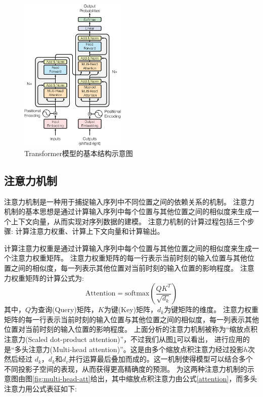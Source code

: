 \begin{figure}[htbp]
  \centering
  \includegraphics[width=0.45\textwidth]{figures/transformer.png}
  \caption{Transformer模型的基本结构示意图\cite{vaswani2017attention}}
  \label{transformer}
\end{figure}

\subsection{注意力机制}
注意力机制是一种用于捕捉输入序列中不同位置之间的依赖关系的机制。
注意力机制的基本思想是通过计算输入序列中每个位置与其他位置之间的相似度来生成一个上下文向量，从而实现对序列数据的建模。
注意力机制的计算过程包括三个步骤: 计算注意力权重、计算上下文向量和计算输出。


计算注意力权重是通过计算输入序列中每个位置与其他位置之间的相似度来生成一个注意力权重矩阵。
注意力权重矩阵的每一行表示当前时刻的输入位置与其他位置之间的相似度，每一列表示其他位置对当前时刻的输入位置的影响程度。
注意力权重矩阵的计算公式为\cite{vaswani2017attention}:
\begin{equation}
  \label{attention}
  \text{Attention} = \text{softmax}\left(\frac{QK^T}{\sqrt{d_k}}\right)
\end{equation}
其中，$Q$为查询(Query)矩阵，$K$为键(Key)矩阵，$d_k$为键矩阵的维度。
注意力权重矩阵的每一行表示当前时刻的输入位置与其他位置之间的相似度，每一列表示其他位置对当前时刻的输入位置的影响程度。
上面分析的注意力机制被称为“缩放点积注意力(Scaled dot-product attention)”，不过我们从图\ref{transformer}可以看出，
进行应用的是“多头注意力(Multi-head attention)”。这是由多个缩放点积注意力经过投影$h$次然后经过
$d_k$，$d_k$和$d_v$并行运算最后叠加而成的。这一机制使得模型可以结合多个不同投影子空间的表现，从而获得更高精确度的预测。
为这两种注意力机制的示意图由图\ref{fig:multi-head-att}给出，其中缩放点积注意力由公式\ref{attention}，而多头注意力用公式表征如下\cite{vaswani2017attention}:

